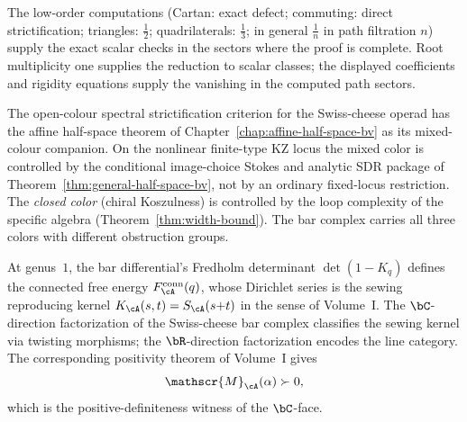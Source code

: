 The low-order computations (Cartan: exact defect; commuting: direct
strictification; triangles: $\frac12$; quadrilaterals: $\frac13$;
in general $\frac1n$ in path filtration $n$) supply the exact scalar
checks in the sectors where the proof is complete. Root multiplicity
one supplies the reduction to scalar classes; the displayed
coefficients and rigidity equations supply the vanishing in the
computed path sectors.

The open-colour spectral strictification criterion for the
Swiss-cheese operad has the affine half-space theorem of
Chapter~\ref{chap:affine-half-space-bv} as its mixed-colour
companion. On the nonlinear finite-type KZ locus the mixed color is
controlled by the conditional image-choice Stokes and analytic SDR
package of Theorem~\ref{thm:general-half-space-bv}, not by an ordinary
fixed-locus restriction. The \emph{closed color} (chiral Koszulness)
is controlled by the loop complexity of the specific algebra
(Theorem~\ref{thm:width-bound}). The bar complex carries all three
colors with different obstruction groups.

\begin{remark}%
\label{rem:vol2-sewing-kernel-connection}%
At genus~$1$, the bar differential's Fredholm determinant
$\det(1 - K_q)$ defines the connected free energy
$F^{\mathrm{conn}}_\cA(q)$, whose Dirichlet series is the
sewing reproducing kernel $K_\cA(s,t) = S_\cA(s{+}t)$
in the sense of Volume~I.
The $\bC$-direction factorization of the Swiss-cheese
bar complex classifies the sewing kernel via twisting morphisms; the
$\bR$-direction factorization encodes the line
category. The corresponding positivity theorem of Volume~I gives
\[
\mathscr{M}_\cA(\alpha) \succ 0,
\]
which is the
positive-definiteness witness of the $\bC$-face.
\end{remark}

